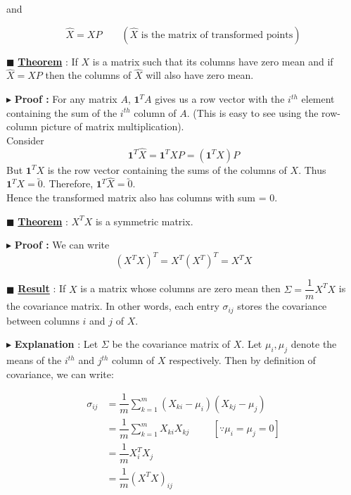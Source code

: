 \documentclass[11pt, a4paper]{article}
\begin{document}
and

\[
\hat{X} = X P
\qquad (\hat{X} \text{ is the matrix of transformed points})
\]


$\blacksquare$ \textbf{\underline{Theorem}} :
If $X$ is a matrix such that its columns have zero mean and if $\hat{X} = X P$ then the columns of $\hat{X}$ will also have zero mean.

$\blacktriangleright$ \textbf{Proof :}
For any matrix $A$, $\mathbf{1}^T A$ gives us a row vector with the $i^{th}$ element containing the sum of the $i^{th}$ column of $A$. (This is easy to see using the row-column picture of matrix multiplication). \\
Consider
\[
\mathbf{1}^T \hat{X} = \mathbf{1}^T X P = \left(\mathbf{1}^T X\right) P
\]
But $\mathbf{1}^T X$ is the row vector containing the sums of the columns of $X$. Thus $\mathbf{1}^T X = \utilde{0}$. Therefore, $\mathbf{1}^T \hat{X} = \utilde{0}$. \\
Hence the transformed matrix also has columns with sum = 0.

\vspace{1em}

$\blacksquare$ \textbf{\underline{Theorem}} :
$X^T X$ is a symmetric matrix.

$\blacktriangleright$ \textbf{Proof :}
We can write
\[
\left( X^T X \right)^T = X^T \left( X^T \right)^T = X^T X
\]


$\blacksquare$ \textbf{\underline{Result}} :
If $X$ is a matrix whose columns are zero mean then $\Sigma = \dfrac{1}{m} X^T X$ is the covariance matrix. In other words, each entry $\sigma_{ij}$ stores the covariance between columns $i$ and $j$ of $X$.

\vspace{1em}

$\blacktriangleright$ \textbf{Explanation} :
Let $\Sigma$ be the covariance matrix of $X$. Let $\mu_i, \mu_j$ denote the means of the $i^{th}$ and $j^{th}$ column of $X$ respectively. Then by definition of covariance, we can write:

\begin{align*}
\sigma_{ij} &= \dfrac{1}{m} \sum\limits_{k=1}^{m} (X_{ki} - \mu_i)(X_{kj} - \mu_j) \\[0.5em]
&= \dfrac{1}{m} \sum\limits_{k=1}^{m} X_{ki} X_{kj} \hspace{1cm} [\because \mu_i = \mu_j = 0] \\[0.5em]
&= \dfrac{1}{m} X_i^T X_j \\[0.5em]
&= \dfrac{1}{m} \left( X^T X \right)_{ij}
\end{align*}
\end{document}

